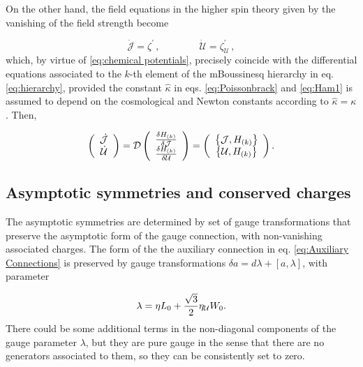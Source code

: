 \documentclass[letterpaper,11pt,oneside]{book}
\begin{document}
On the other hand, the field equations in the higher spin theory given
by the vanishing of the field strength become

\begin{equation}
	\dot{\mathcal{J}}=\zeta^{\prime}\,,\qquad\qquad\dot{\mathcal{U}}=\zeta_{\mathcal{U}}^{\prime}\,,\label{eq:Field equations}
\end{equation}
which, by virtue of \eqref{eq:chemical potentials}, precisely coincide
with the differential equations associated to the $k$-th element
of the mBoussinesq hierarchy in eq. \eqref{eq:hierarchy}, provided
the constant $\hat{\kappa}$ in eqs. \eqref{eq:Poissonbrack} and
\eqref{eq:Ham1} is assumed to depend on the cosmological and Newton
constants according to $\hat{\kappa}=\kappa$. Then,

\begin{equation}
	\left(\begin{array}{c}
		\dot{\mathcal{J}}\\
		\dot{{\cal U}}
	\end{array}\right)=\mathcal{D}\left(\begin{array}{c}
		\frac{\delta H_{\left(k\right)}}{\delta\mathcal{J}}\\
		\frac{\delta H_{\left(k\right)}}{\delta\mathcal{U}}
	\end{array}\right)=\left(\begin{array}{c}
		\left\{ \mathcal{J},H_{\left(k\right)}\right\} \\
		\left\{ {\cal U},H_{\left(k\right)}\right\} 
	\end{array}\right).\label{eq:EOM}
\end{equation}


\subsection{Asymptotic symmetries and conserved charges\label{subsec:2.3 Asymptotic-symmetries-and}}

The asymptotic symmetries are determined by set of gauge transformations
that preserve the asymptotic form of the gauge connection, with non-vanishing
associated charges. The form of the the auxiliary connection in eq.
\eqref{eq:Auxiliary Connections} is preserved by gauge transformations
$\delta a=d\lambda+\left[a,\lambda\right]$, with parameter

\[
\lambda=\eta L_{0}+\frac{\sqrt{3}}{2}\eta_{{\cal U}}W_{0}.
\]
There could be some additional terms in the non-diagonal components
of the gauge parameter $\lambda$, but they are pure gauge in the
sense that there are no generators associated to them, so they can
be consistently set to zero.
\end{document}
